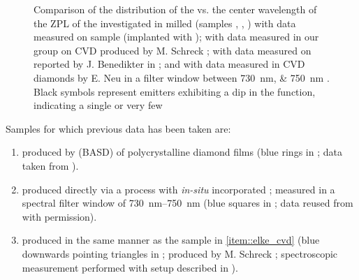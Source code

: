 	\begin{figure}[!htb]
		\centering
		\caption[Comparison of \siv \lws with available data sources]{Comparison of the distribution of the \lw vs. the center wavelength of the ZPL of the investigated \sivs in milled \nds (samples \insituF, \insituS, \insituH) with data measured on sample \implantedTao (implanted with \Si); with data measured in our group on CVD \nds produced by M. Schreck \cite{Neu2011b}; with data measured on \nds reported by J. Benedikter in \cite{Benedikter2017a}; and with data measured in CVD diamonds by E. Neu in a filter window between \SIlist{730; 750}{nm} \cite{Neu2012}. Black symbols represent emitters exhibiting a dip in the \gtz function, indicating a single or very few \sivs}
		\label{fig::bimodal_distr_compare}
	\end{figure}


	Samples for which previous data has been taken are:
	\begin{enumerate}
		\item \nds produced by \basd (BASD) of polycrystalline \CVD diamond films (blue rings in  \cite{Neu2011a}; data taken from \cite{Benedikter2017a}).
		\item \label{item::elke_cvd}\nds produced directly via a \CVD process with \textit{in-situ} incorporated \sivs; measured in a spectral filter window of \SIrange{730}{750}{nm} (blue squares in ; data reused from \cite{Neu2012} with permission).
		\item \nds produced in the same manner as the \CVD sample in \ref{item::elke_cvd} (blue downwards pointing triangles in ; produced by M. Schreck \cite{Neu2011b}; spectroscopic measurement performed with setup described in ).
	\end{enumerate}
	
